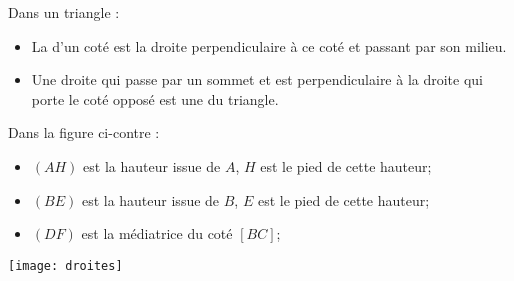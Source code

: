 \begin{mydefs}
	Dans un triangle :
	\begin{itemize}
		\item La  d'un coté est la droite perpendiculaire à ce coté et passant par son milieu.
		
		\item Une droite qui passe par un sommet et est perpendiculaire à la droite qui porte le coté opposé est une  du triangle. 
	\end{itemize}
\end{mydefs}

\begin{myexs}
	\begin{multicols}{2}
		Dans la figure ci-contre :
		
		\begin{itemize}
			\item $(AH)$ est la hauteur issue de $A$, $H$ est le pied de cette hauteur;
			\item $(BE)$ est la hauteur issue de $B$, $E$ est le pied de cette hauteur;
			\item $(DF)$ est la médiatrice du coté $[BC]$;
		\end{itemize}
		\begin{center}
			\texttt{[image: droites]}
		\end{center}
	\end{multicols}
\end{myexs}